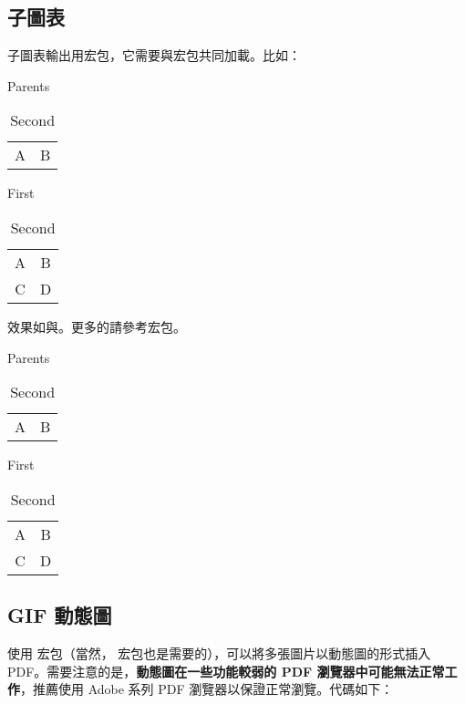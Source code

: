 \subsection{子圖表}
子圖表輸出用宏包，它需要與宏包共同加載。比如：
\begin{latex}
\usepackage{caption,subcaption}
  \captionsetup[sub]{labelformat=simple}
  \renewcommand{\thesubtable}{(\alph{subtable})}
\begin{table}
\caption{Parents}
\begin{subtable}[b]{0.5\linewidth}
  \centering
  \begin{tabular}{|c|c|}
  A & B \\ \end{tabular}
  \caption{First}\label{...}
\end{subtable}  
\begin{subtable}[b]{0.5\linewidth}
  \centering
  \begin{tabular}{|c|c|}
  A & B \\ C & D \end{tabular}
  \caption{Second}
\end{subtable}  
\end{table}
\end{latex}

效果如與。更多的請參考宏包。
\begin{table}[!htb]
\caption{Parents}
\begin{subtable}[b]{0.5\linewidth}
  \centering
  \begin{tabular}{|c|c|}
  A & B \\ \end{tabular}
  \caption{First}\label{subtab:subcaption1}
\end{subtable}  
\begin{subtable}[b]{0.5\linewidth}
  \centering
  \begin{tabular}{|c|c|}
  A & B \\ C & D \end{tabular}
  \caption{Second}\label{subtab:subcaption2}
\end{subtable}  
\end{table}

\subsection{GIF 動態圖}
使用  宏包（當然， 宏包也是需要的），可以將多張圖片以動態圖的形式插入 PDF。需要注意的是，\textbf{動態圖在一些功能較弱的 PDF 瀏覽器中可能無法正常工作}，推薦使用 Adobe 系列 PDF 瀏覽器以保證正常瀏覽。代碼如下：
\begin{latex}
\begin{figure}[!hbt]
  \centering
\end{figure}
\end{latex}

